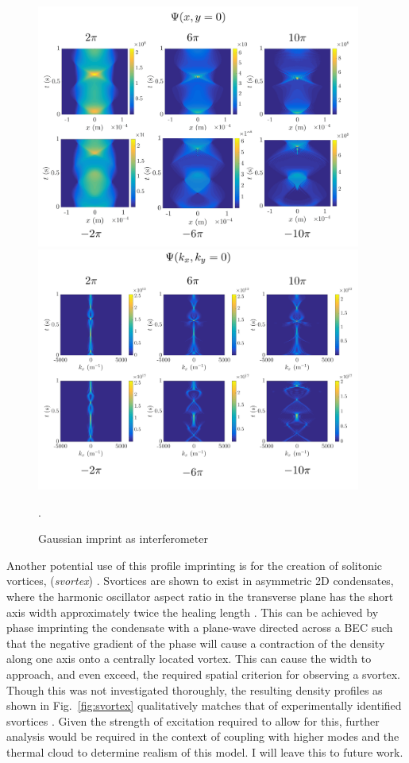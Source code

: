 \begin{figure}\centering
    \includegraphics[width=0.95\textwidth]{Images/ch4_vtx/velocity/gaussian_imprint_wfcr}
    \includegraphics[width=0.95\textwidth]{Images/ch4_vtx/velocity/gaussian_imprint_wfck}    \caption{Gaussian imprint as interferometer}.\label{fig:gaussian_wfc}
\end{figure}


Another potential use of this profile imprinting is for the creation of solitonic vortices, (\textit{svortex}) \cite{}. Svortices are shown to exist in asymmetric 2D condensates, where the harmonic oscillator aspect ratio in the transverse plane has the short axis width approximately twice the healing length \cite{}. This can be achieved by phase imprinting the condensate with a plane-wave directed across a BEC such that the negative gradient of the phase will cause a contraction of the density along one axis onto a centrally located vortex. This can cause the width to approach, and even exceed, the required spatial criterion for observing a svortex. Though this was not investigated thoroughly, the resulting density profiles as shown in Fig.~\ref{fig:svortex} qualitatively matches that of experimentally identified svortices \cite{}. Given the strength of excitation required to allow for this, further analysis would be required in the context of coupling with higher modes and the thermal cloud to determine realism of this model. I will leave this to future work.

